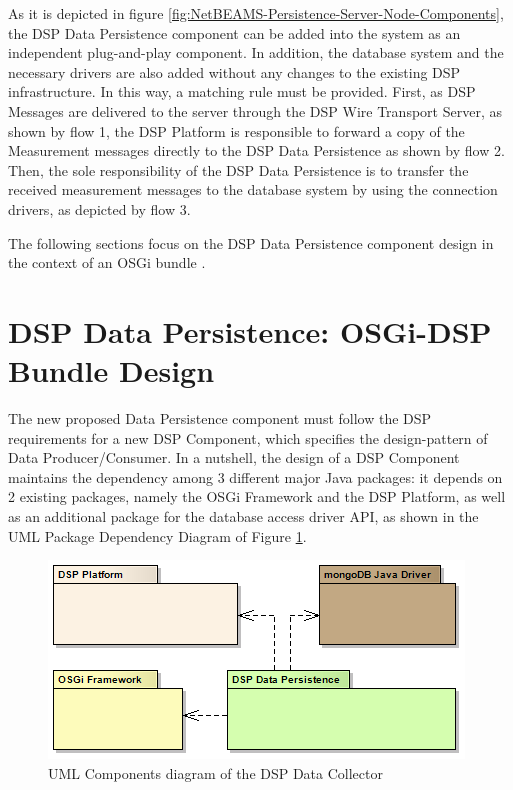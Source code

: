 As it is depicted in figure
\ref{fig:NetBEAMS-Persistence-Server-Node-Components}, the DSP Data
Persistence component can be added into the system as an independent
plug-and-play component. In addition, the database system and the necessary
drivers are also added without any changes to the existing DSP infrastructure.
In this way, a matching rule must be provided. First, as DSP Messages are
delivered to the server through the DSP Wire Transport Server, as shown by
flow 1, the DSP Platform is responsible to forward a copy of the Measurement
messages directly to the DSP Data Persistence as shown by flow 2. Then, the
sole responsibility of the DSP Data Persistence is to transfer the received
measurement messages to the database system by using the connection drivers,
as depicted by flow 3.

The following sections focus on the DSP Data Persistence component design in
the context of an OSGi bundle \cite{osgi}.

\section{DSP Data Persistence: OSGi-DSP Bundle Design}

The new proposed Data Persistence component must follow the DSP requirements
for a new DSP Component, which specifies the design-pattern of Data
Producer/Consumer. In a nutshell, the design of a DSP Component maintains the
dependency among 3 different major Java packages: it depends on 2 existing
packages, namely the OSGi Framework and the DSP Platform, as well as an
additional package for the database access driver API, as shown in the UML
Package Dependency Diagram of Figure
\ref{fig:DSP-Data-Persistence-Packages-Dependency}.

\begin{figure}[!h]
  \centering
  \includegraphics[scale=0.5]{../diagrams/DSP-Data-Persistence-Packages-Dependency}
  \caption{UML Components diagram of the DSP Data Collector}
  \label{fig:DSP-Data-Persistence-Packages-Dependency}
\end{figure}

